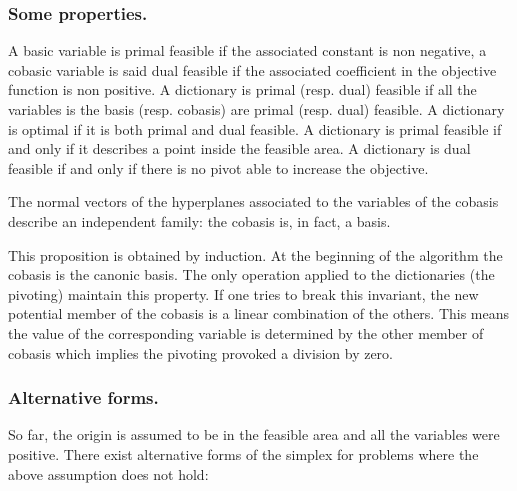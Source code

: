 



\subsubsection{Some properties.}
A basic variable is primal feasible if the associated constant is non negative, a cobasic variable is said dual feasible if the associated coefficient in the objective function is non positive. A dictionary is primal (resp. dual) feasible if all the variables is the basis (resp. cobasis) are primal (resp. dual) feasible. A dictionary is optimal if it is both primal and dual feasible. A dictionary is primal feasible if and only if it describes a point inside the feasible area. A dictionary is dual feasible if and only if there is no pivot able to increase the objective.

\begin{proposition}
The normal vectors of the hyperplanes associated to the variables of the cobasis describe an independent family: the cobasis is, in fact, a basis.
\end{proposition}
\vspace*{-0.1cm}
This proposition is obtained by induction. At the beginning of the algorithm the cobasis is the canonic basis. The only operation applied to the dictionaries (the pivoting) maintain this property. If one tries to break this invariant, the new potential member of the cobasis is a linear combination of the others. This means the value of the corresponding variable is determined by the other member of cobasis which implies the pivoting provoked a division by zero.


\subsubsection{Alternative forms.}
\label{section_altsimplex}
So far, the origin is assumed to be in the feasible area and all the variables were positive. There exist alternative forms of the simplex for problems where the above assumption does not hold:

